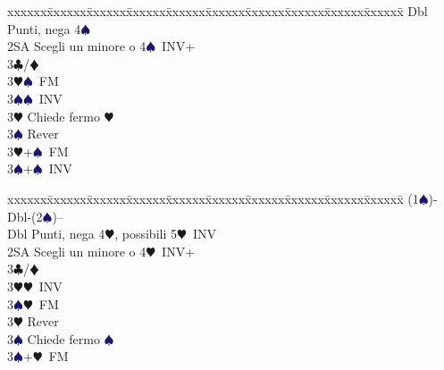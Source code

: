 \documentclass[a4paper,italian]{article}
\newcommand{\BC}{\textcolor{OliveGreen}{$\clubsuit$}}
\newcommand{\BD}{\textcolor{RedOrange}{$\vardiamondsuit$}}
\newcommand{\BH}{\textcolor{Red2}{$\varheartsuit${}}}
\newcommand{\BS}{\textcolor{MidnightBlue}{$\spadesuit${}}}
\newenvironment{bidtable}
{\begin{tabbing}

    xxxxxx\=xxxxxx\=xxxxxx\=xxxxxx\=xxxxxx\=xxxxxx\=xxxxxx\=xxxxxx\=xxxxxx\=xxxxxx\=\kill}
{\end{tabbing} }%
\begin{document}
\begin{multicols}{2}
\begin{bidtable}
                                            Dbl\> Punti, nega 4\BS\\
                                            2SA \> Scegli un minore o 4\BS\ INV+\+\\
                                            3\BC/\BD\+\\
                                            3\BH {}\BS\ FM\\
                                            3\BS {}\BS\ INV\-\\
                                            3\BH \> Chiede fermo \BH\\
                                            3\BS \> Rever\-\\
                                            3\BH {}+\BS\ FM\\
                                            3\BS {}+\BS\ INV\\
                                        \end{bidtable}
                                        \begin{bidtable}
                                            (1\BS)-Dbl-(2\BS)--\\
                                            Dbl\> Punti, nega 4\BH, possibili 5\BH\ INV\\
                                            2SA \> Scegli un minore o 4\BH\ INV+\+\\
                                            3\BC/\BD\+\\
                                            3\BH {}\BH\ INV\\
                                            3\BS {}\BH\ FM\-\\
                                            3\BH \> Rever\\
                                            3\BS \> Chiede fermo \BS\-\\
                                            3\BS {}+\BH\ FM\\
                                        \end{bidtable}

\end{multicols}
\end{document}
